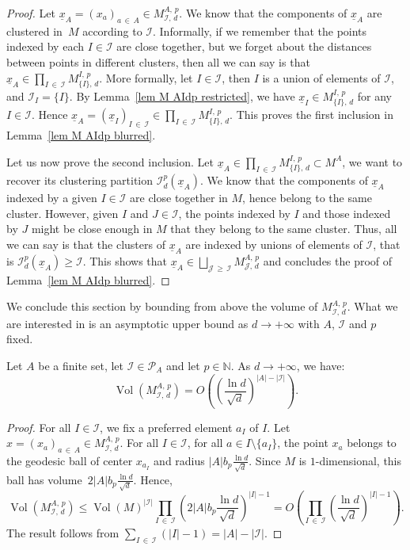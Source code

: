 \documentclass[AHL,Unicode,longabstracts,published]{cedram}
\DeclareMathOperator{\Vol}{Vol}
\newcommand{\I}{\mathcal{I}}
\newcommand{\J}{\mathcal{J}}
\newcommand{\pa}{\mathcal{P}\!}
\newcommand{\N}{\mathbb{N}}
\newcommand{\norm}[1]{\left\lvert #1 \right\rvert}
\newcommand{\vol}[1]{\Vol\!\left(#1\right)}
\renewcommand{\geq}{\geqslant}
\renewcommand{\leq}{\leqslant}
\begin{document}
\begin{proof}
Let $\underline{x}_A= (x_a)_{a\,\in\,A} \in M^{A,\,p}_{\I,\,d}$. We know that the components of $\underline{x}_A$ are clustered in~$M$ according to $\I$. Informally, if we remember that the points indexed by each $I \in \I$ are close together, but we forget about the distances between points in different clusters, then all we can say is that $\underline{x}_A \in \prod_{I\,\in\,\I} M^{I,\,p}_{\{I\},\,d}$. More formally, let $I \in \I$, then $I$ is a union of elements of $\I$, and $\I_I = \{I\}$. By Lemma~\ref{lem M AIdp restricted}, we have $\underline{x}_I \in M^{I,\,p}_{\{I\},\,d}$ for any $I \in \I$. Hence $\underline{x}_A =(\underline{x}_I)_{I\,\in\,\I} \in \prod_{I\,\in\,\I} M^{I,\,p}_{\{I\},\,d}$. This proves the first inclusion in Lemma~\ref{lem M AIdp blurred}.

Let us now prove the second inclusion. Let $\underline{x}_A \in \prod_{I\,\in\,\I} M^{I,\,p}_{\{I\},\,d} \subset M^A$, we want to recover its clustering partition $\I_d^p(\underline{x}_A)$. We know that the components of $\underline{x}_A$ indexed by a given $I \in \I$ are close together in $M$, hence belong to the same cluster. However, given $I$ and $J \in \I$, the points indexed by $I$ and those indexed by $J$ might be close enough in $M$ that they belong to the same cluster. Thus, all we can say is that the clusters of $\underline{x}_A$ are indexed by unions of elements of $\I$, that is $\I_d^p(\underline{x}_A) \geq \I$. This shows that $\underline{x}_A \in \bigsqcup_{\J\, \geq\,\I} M^{A,\,p}_{\J,\,d}$ and concludes the proof of Lemma~\ref{lem M AIdp blurred}.
\end{proof}

We conclude this section by bounding from above the volume of $M^{A,\,p}_{\I,\,d}$. What we are interested in is an asymptotic upper bound as $d \to +\infty$ with $A$, $\I$ and $p$ fixed.

\begin{lemm}\label{lem volume M AIdp}
Let $A$ be a finite set, let $\I \in \pa_A$ and let $p \in \N$. As $d \to +\infty$, we have:
\[
\vol{M^{A,\,p}_{\I,\,d}} = O\!\left(\left(\frac{\ln d}{\sqrt{d}}\right)^{\norm{A}-\norm{\I}}\right).
\]
\end{lemm}

\begin{proof}
For all $I \in \I$, we fix a preferred element $a_I$ of $I$. Let $x = (x_a)_{a\,\in\,A} \in M^{A,\,p}_{\I,\,d}$. For all $I \in \I$, for all $a \in I \setminus \{a_I\}$, the point $x_a$ belongs to the geodesic ball of center $x_{a_I}$ and radius $|A| b_p \frac{\ln d}{\sqrt{d}}$. Since $M$ is $1$-dimensional, this ball has volume~$2|A| b_p \frac{\ln d}{\sqrt{d}}$. Hence,
\[
\vol{M^{A,\,p}_{\I,\,d}} \leq \vol{M}^{\norm{\I}} \prod_{I\,\in \,\I} \left(2\norm{A}b_p \frac{\ln d}{\sqrt{d}}\right)^{\norm{I}-1} = O\!\left(\prod_{I\,\in\,\I}\left(\frac{\ln d}{\sqrt{d}}\right)^{\norm{I}-1}\right).
\]
The result follows from $\sum_{I\,\in\,\I} (|I|-1) = |A|-|\I|$.
\end{proof}
\end{document}
